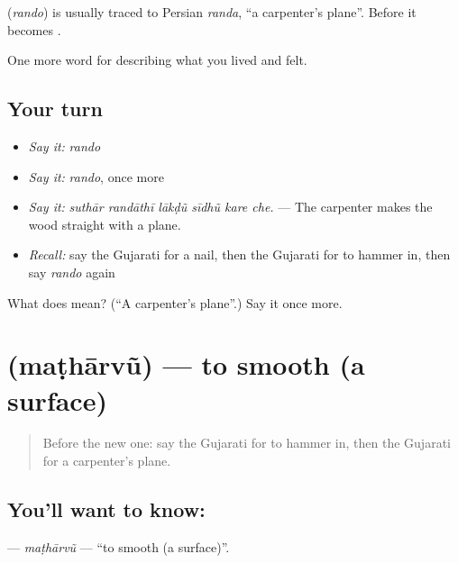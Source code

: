 \begin{cousinweb}
\textbf{} (\emph{rando}) is usually traced to Persian \emph{randa}, \textquotedblleft{}a carpenter's plane\textquotedblright{}. Before \textbf{} it becomes \textbf{}.
\end{cousinweb}

\begin{grammarlens}[title={What you've built}]
One more word for describing what you lived and felt.
\end{grammarlens}

\subsection*{Your turn}
\begin{itemize}
\raggedright
  \item \emph{Say it:} \emph{rando}
  \item \emph{Say it:} \emph{rando}, once more
  \item \emph{Say it:} \emph{suthār randāthī lākḍũ sīdhũ kare che.} — The carpenter makes the wood straight with a plane.
  \item \emph{Recall:} say the Gujarati for a nail, then the Gujarati for to hammer in, then say \emph{rando} again
\end{itemize}

\begin{tcolorbox}[breakable,colback=teal!4,colframe=teal!35!black,title={Before you move on}]
What does  mean? (\textquotedblleft{}A carpenter's plane\textquotedblright{}.) Say it once more.
\end{tcolorbox}
\section[\texorpdfstring{\gu{મઠારવું} (maṭhārvũ)}{મઠારવું (maṭhārvũ)}]{ (maṭhārvũ) — to smooth (a surface)}

\label{lesson:GU-C503-matharvu}



\begin{quote}
Before the new one: say the Gujarati for to hammer in, then the Gujarati for a carpenter's plane.
\end{quote}

\subsection*{You'll want to know: }
\textbf{} — \emph{maṭhārvũ} — \textquotedblleft{}to smooth (a surface)\textquotedblright{}.

